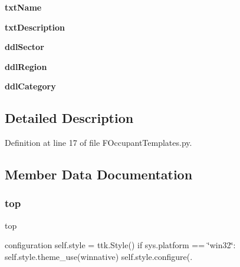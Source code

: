 \begin{DoxyCompactItemize}
{\bfseries txt\+Name}
\item 
\mbox{\label{class_f_occupant_templates_1_1_frm_occupant_templates_a077ff90d6e1ad5952cf3fdf11425850c}} 
{\bfseries txt\+Description}
\item 
\mbox{\label{class_f_occupant_templates_1_1_frm_occupant_templates_a932eda1eaef9afc4a195d6e88ccc4e83}} 
{\bfseries ddl\+Sector}
\item 
\mbox{\label{class_f_occupant_templates_1_1_frm_occupant_templates_a2908c047368850827dd367d2b7834f44}} 
{\bfseries ddl\+Region}
\item 
\mbox{\label{class_f_occupant_templates_1_1_frm_occupant_templates_a773267719f8b87725ebc5461cbab0bdc}} 
{\bfseries ddl\+Category}
\end{DoxyCompactItemize}


\subsection{Detailed Description}


Definition at line 17 of file F\+Occupant\+Templates.\+py.



\subsection{Member Data Documentation}
\mbox{\label{class_f_occupant_templates_1_1_frm_occupant_templates_a8aab264665f2085687d9eeca4c67a691}} 
\subsubsection{\texorpdfstring{top}{top}}
{\footnotesize\ttfamily top}



configuration self.\+style = ttk.\+Style() if sys.\+platform == \char`\"{}win32\char`\"{}\+: self.\+style.\+theme\+\_\+use(\textquotesingle{}winnative\textquotesingle{}) self.\+style.\+configure(\textquotesingle{}. 

